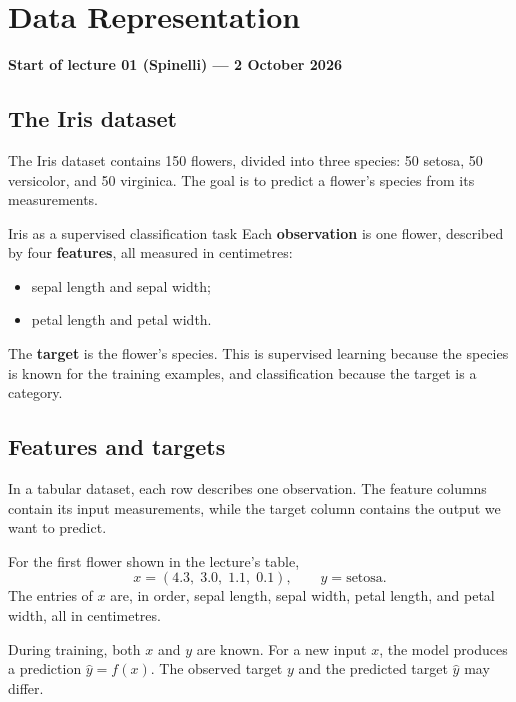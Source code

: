 \documentclass[a4paper,12pt,oneside]{report}
\begin{document}
\chapter{Data Representation}

\begin{tcolorbox}[colback=yellow!20,colframe=yellow!60!black,
  boxrule=0.4pt,arc=1mm,left=5pt,right=5pt,top=3pt,bottom=3pt,
  before skip=0pt,after skip=0pt]
\small\textbf{Start of lecture 01 (Spinelli) --- 2 October 2026}
\end{tcolorbox}

\section{The Iris dataset}

The Iris dataset contains 150 flowers, divided into three species:
50 setosa, 50 versicolor, and 50 virginica. The goal is to predict a
flower's species from its measurements.

\begin{framedexample}{Iris as a supervised classification task}
Each \textbf{observation} is one flower, described by four
\textbf{features}, all measured in centimetres:
\begin{itemize}
  \item sepal length and sepal width;
  \item petal length and petal width.
\end{itemize}
The \textbf{target} is the flower's species. This is supervised learning
because the species is known for the training examples, and
classification because the target is a category.
\end{framedexample}

\clearpage
\section{Features and targets}

In a tabular dataset, each row describes one observation. The feature
columns contain its input measurements, while the target column contains
the output we want to predict.

For the first flower shown in the lecture's table,
\[
  x=(4.3,\;3.0,\;1.1,\;0.1),
  \qquad y=\text{setosa}.
\]
The entries of $x$ are, in order, sepal length, sepal width, petal length,
and petal width, all in centimetres.

During training, both $x$ and $y$ are known. For a new input $x$, the model
produces a prediction $\hat{y}=f(x)$. The observed target $y$ and the
predicted target $\hat{y}$ may differ.
\end{document}
